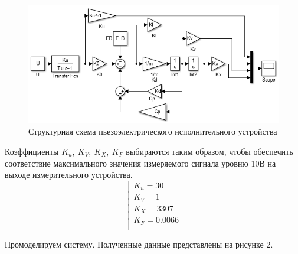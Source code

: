 \documentclass[a4paper, 12pt]{article}
\begin{document}
\begin{figure}[h!]
	\centering
	\includegraphics[scale=0.9]{images/model.png}
	\caption{Структурная схема пьезоэлектрического исполнительного устройства}
\end{figure}
\par 
Коэффициенты $K_u,\ K_V,\ K_X,\ K_F$ выбираются таким образом, чтобы обеспечить соответствие максимального значения измеряемого сигнала уровню 10В на выходе измерительного устройства.
\begin{equation}
	\left[
	\begin{matrix}
		K_u = 30\\
		K_V = 1\\
		K_X = 3307\\
		K_F = 0.0066\\
	\end{matrix}
	\right.
\end{equation}
\par 
Промоделируем систему. Полученные данные представлены на рисунке 2.
\newpage
\end{document}
